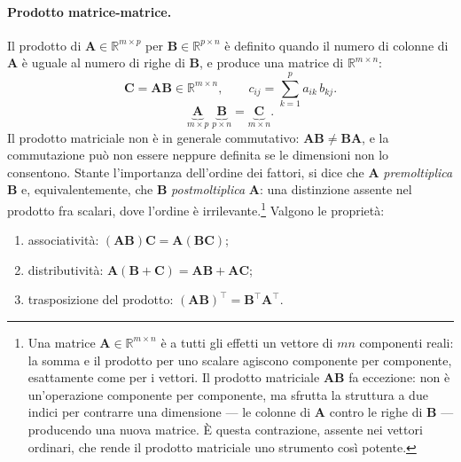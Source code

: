 \paragraph{Prodotto matrice-matrice.}
Il prodotto di $\bm{A} \in \mathbb{R}^{m \times p}$ per $\bm{B} \in \mathbb{R}^{p \times n}$ \`e definito quando il numero di colonne di $\bm{A}$ \`e uguale al numero di righe di $\bm{B}$, e produce una matrice di $\mathbb{R}^{m \times n}$:
\begin{equation}\label{eq:prod_mat_mat}
	\bm{C} = \bm{A}\bm{B} \in \mathbb{R}^{m \times n}, \qquad c_{ij} = \sum_{k=1}^{p} a_{ik}\, b_{kj}.
\end{equation}
\begin{equation}\label{eq:consist_mat_mat}
	\underbrace{\bm{A}}_{m \times p}\;\underbrace{\bm{B}}_{p \times n} = \underbrace{\bm{C}}_{m \times n}.
\end{equation}
Il prodotto matriciale non \`e in generale commutativo:
$\bm{A}\bm{B} \neq \bm{B}\bm{A}$, e la commutazione pu\`o non essere
neppure definita se le dimensioni non lo consentono. Stante l'importanza
dell'ordine dei fattori, si dice che $\bm{A}$ \textit{premoltiplica}
$\bm{B}$ e, equivalentemente, che $\bm{B}$ \textit{postmoltiplica}
$\bm{A}$: una distinzione assente nel prodotto fra scalari, dove l'ordine
\`e irrilevante.\footnote{Una matrice $\bm{A} \in \mathbb{R}^{m \times n}$
	è a tutti gli effetti un vettore di $mn$ componenti reali:
	la somma e il prodotto per uno scalare agiscono
	componente per componente, esattamente come per i vettori.
	Il prodotto matriciale $\bm{A}\bm{B}$ fa eccezione: non
	è un'operazione componente per componente, ma sfrutta
	la struttura a due indici per contrarre una dimensione
	--- le colonne di $\bm{A}$ contro le righe di $\bm{B}$
	--- producendo una nuova matrice. È questa contrazione,
	assente nei vettori ordinari, che rende il prodotto
	matriciale uno strumento così potente.} 
Valgono le propriet\`a:

\begin{enumerate}[label=(\roman*)]
	\item associativit\`a: $(\bm{A}\bm{B})\bm{C} = \bm{A}(\bm{B}\bm{C})$;
	\item distributivit\`a: $\bm{A}(\bm{B}+\bm{C}) = \bm{A}\bm{B}+\bm{A}\bm{C}$;
	\item trasposizione del prodotto: $(\bm{A}\bm{B})^\top = \bm{B}^\top\bm{A}^\top$.
\end{enumerate}


